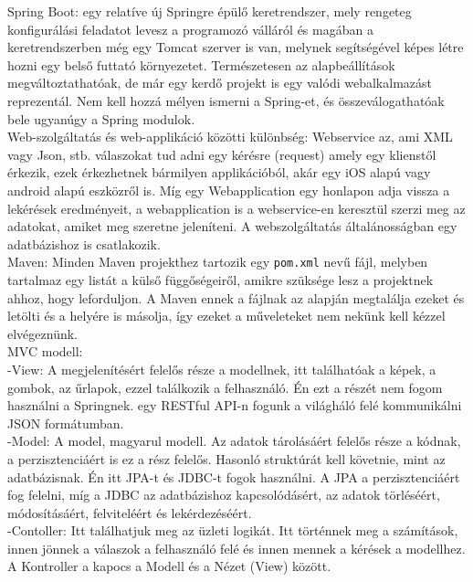 \documentclass[11pt]{article}
\begin{document}
Spring Boot: egy relatíve új Springre épülő keretrendszer, mely rengeteg konfigurálási feladatot levesz a programozó válláról és magában a keretrendszerben még egy Tomcat szerver is van, melynek segítségével képes létre hozni egy belső futtató környezetet. Természetesen az alapbeállítások megváltoztathatóak, de már egy kerdő projekt is egy valódi webalkalmazást reprezentál. Nem kell hozzá mélyen ismerni a Spring-et, és összeválogathatóak bele ugyanúgy a Spring modulok. \\

Web-szolgáltatás és web-applikáció közötti különbség: Webservice az, ami XML vagy Json, stb. válaszokat tud adni egy kérésre (request) amely egy klienstől érkezik, ezek érkezhetnek bármilyen applikációból, akár egy iOS alapú vagy android alapú eszközről is. Míg egy Webapplication egy honlapon adja vissza a lekérések eredményeit, a webapplication is a webservice-en keresztül szerzi meg az adatokat, amiket meg szeretne jeleníteni. A webszolgáltatás általánosságban egy adatbázishoz is csatlakozik.\\

Maven: Minden Maven projekthez tartozik egy \texttt{pom.xml} nevű fájl, melyben tartalmaz egy listát a külső függőségeiről, amikre szüksége lesz a projektnek ahhoz, hogy leforduljon. A Maven ennek a fájlnak az alapján megtalálja ezeket és letölti és a helyére is másolja, így ezeket a műveleteket nem nekünk kell kézzel elvégeznünk.\\

MVC modell:\\

-View: A megjelenítésért felelős része a modellnek, itt találhatóak a képek, a gombok, az űrlapok, ezzel találkozik a felhasználó. Én ezt a részét nem fogom használni a Springnek. egy RESTful API-n fogunk a világháló felé kommunikálni JSON formátumban.\\

-Model: A model, magyarul modell. Az adatok tárolásáért felelős része a kódnak, a perzisztenciáért is ez a rész felelős. Hasonló struktúrát kell követnie, mint az adatbázisnak. Én itt JPA-t és JDBC-t fogok használni. A JPA a perzisztenciáért fog felelni, míg a JDBC az adatbázishoz kapcsolódásért, az adatok törléséért, módosításáért, felviteléért és lekérdezéséért.\\

-Contoller: Itt találhatjuk meg az üzleti logikát. Itt történnek meg a számítások, innen jönnek a válaszok a felhasználó felé és innen mennek a kérések a modellhez. A Kontroller a kapocs a Modell és a Nézet (View) között.\\
\end{document}
